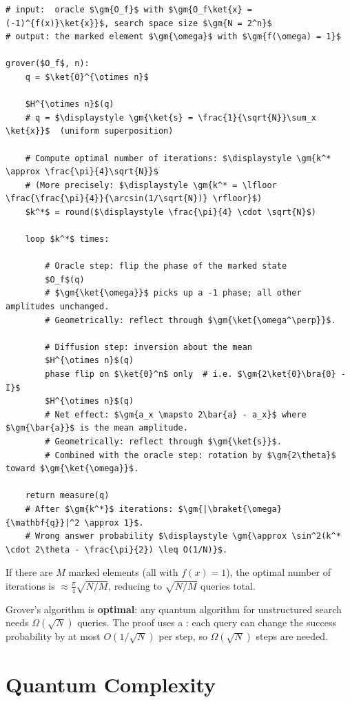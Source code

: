 \documentclass[oneside]{academica}
\begin{document}
\begin{lstlisting}
# input:  oracle $\gm{O_f}$ with $\gm{O_f\ket{x} = (-1)^{f(x)}\ket{x}}$, search space size $\gm{N = 2^n}$
# output: the marked element $\gm{\omega}$ with $\gm{f(\omega) = 1}$

grover($O_f$, n):
    q = $\ket{0}^{\otimes n}$

    $H^{\otimes n}$(q)
    # q = $\displaystyle \gm{\ket{s} = \frac{1}{\sqrt{N}}\sum_x \ket{x}}$  (uniform superposition)

    # Compute optimal number of iterations: $\displaystyle \gm{k^* \approx \frac{\pi}{4}\sqrt{N}}$
    # (More precisely: $\displaystyle \gm{k^* = \lfloor \frac{\frac{\pi}{4}}{\arcsin(1/\sqrt{N})} \rfloor}$)
    $k^*$ = round($\displaystyle \frac{\pi}{4} \cdot \sqrt{N}$)

    loop $k^*$ times:

        # Oracle step: flip the phase of the marked state
        $O_f$(q)
        # $\gm{\ket{\omega}}$ picks up a -1 phase; all other amplitudes unchanged.
        # Geometrically: reflect through $\gm{\ket{\omega^\perp}}$.

        # Diffusion step: inversion about the mean
        $H^{\otimes n}$(q)
        phase flip on $\ket{0}^n$ only  # i.e. $\gm{2\ket{0}\bra{0} - I}$
        $H^{\otimes n}$(q)
        # Net effect: $\gm{a_x \mapsto 2\bar{a} - a_x}$ where $\gm{\bar{a}}$ is the mean amplitude.
        # Geometrically: reflect through $\gm{\ket{s}}$.
        # Combined with the oracle step: rotation by $\gm{2\theta}$ toward $\gm{\ket{\omega}}$.

    return measure(q)
    # After $\gm{k^*}$ iterations: $\gm{|\braket{\omega}{\mathbf{q}}|^2 \approx 1}$.
    # Wrong answer probability $\displaystyle \gm{\approx \sin^2(k^* \cdot 2\theta - \frac{\pi}{2}) \leq O(1/N)}$.
\end{lstlisting}

If there are $M$ marked elements (all with $f(x)=1$), the optimal number of iterations is $\approx\frac\pi4\sqrt{N/M}$, reducing to $\sqrt{N/M}$ queries total.

Grover's algorithm is \textbf{optimal}: any quantum algorithm for unstructured search needs $\Omega(\sqrt{N})$ queries.
The proof uses a : each query can change the success probability by at most $O(1/\sqrt{N})$ per step, so $\Omega(\sqrt{N})$ steps are needed.

\section{Quantum Complexity}
\end{document}
